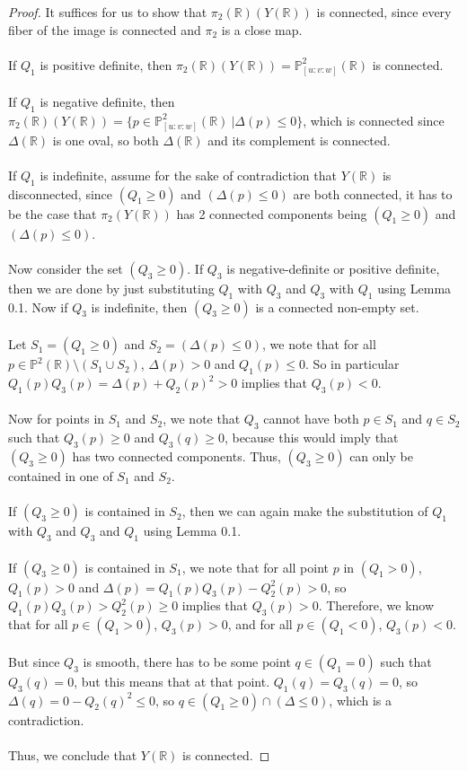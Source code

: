 \documentclass{article}
\newcommand{\Rbb}{\mathbb{R}}
\newcommand{\Pbb}{\mathbb{P}}
\begin{document}
\begin{proof}
It suffices for us to show that $\pi_2(\Rbb)(Y(\Rbb))$ is connected, since every fiber of the image is connected and $\pi_2$ is a close map.\\\\
If $Q_1$ is positive definite, then $\pi_2(\Rbb)(Y(\Rbb)) = \Pbb^2_{[u:v:w]}(\Rbb)$ is connected.\\\\
If $Q_1$ is negative definite, then $\pi_2(\Rbb)(Y(\Rbb)) = \{p \in \Pbb^2_{[u:v:w]}(\Rbb)\ | \Delta(p) \leq 0\}$, which is connected since $\Delta(\Rbb)$ is one oval, so both $\Delta(\Rbb)$ and its complement is connected.\\\\
If $Q_1$ is indefinite, assume for the sake of contradiction that $Y(\Rbb)$ is disconnected, since $(Q_1 \geq 0)$ and $(\Delta(p) \leq 0)$ are both connected, it has to be the case that $\pi_2(Y(\Rbb))$ has 2 connected components being $(Q_1 \geq 0)$ and $(\Delta(p) \leq 0)$.\\\\
Now consider the set $(Q_3 \geq 0)$. If $Q_3$ is negative-definite or positive definite, then we are done by just substituting $Q_1$ with $Q_3$ and $Q_3$ with $Q_1$ using Lemma 0.1. Now if $Q_3$ is indefinite, then $(Q_3 \geq 0)$ is a connected non-empty set.\\\\
Let $S_1 = (Q_1 \geq 0)$ and $S_2 = (\Delta(p) \leq 0)$, we note that for all $p \in \Pbb^2(\Rbb) \setminus (S_1 \cup S_2)$, $\Delta(p) > 0$ and $Q_1(p) \leq 0$. So in particular $Q_1(p)Q_3(p) = \Delta(p) + Q_2(p)^2 > 0$ implies that $Q_3(p) < 0$.\\\\
Now for points in $S_1$ and $S_2$, we note that $Q_3$ cannot have both $p \in S_1$ and $q \in S_2$ such that $Q_3(p) \geq 0$ and $Q_3(q) \geq 0$, because this would imply that $(Q_3 \geq 0)$ has two connected components. Thus, $(Q_3 \geq 0)$ can only be contained in one of $S_1$ and $S_2$.\\\\
If $(Q_3 \geq 0)$ is contained in $S_2$, then we can again make the substitution of $Q_1$ with $Q_3$ and $Q_3$ and $Q_1$ using Lemma 0.1.\\\\
If $(Q_3 \geq 0)$ is contained in $S_1$, we note that for all point $p$ in $(Q_1 > 0)$, $Q_1(p) > 0$ and $\Delta(p) = Q_1(p)Q_3(p) - Q_2^2(p) > 0$, so $Q_1(p)Q_3(p) > Q_2^2(p) \geq 0$ implies that $Q_3(p) > 0$. Therefore, we know that for all $p \in (Q_1 > 0)$, $Q_3(p) > 0$, and for all $p \in (Q_1 < 0)$, $Q_3(p) < 0$.\\\\
But since $Q_3$ is smooth, there has to be some point $q \in (Q_1 = 0)$ such that $Q_3(q) = 0$, but this means that at that point. $Q_1(q) = Q_3(q) = 0$, so $\Delta(q) = 0 - Q_2(q)^2 \leq 0$, so $q \in (Q_1 \geq 0) \cap (\Delta \leq 0)$, which is a contradiction.\\\\
Thus, we conclude that $Y(\Rbb)$ is connected.
\end{proof}
\end{document}
